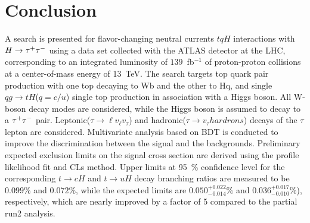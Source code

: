 \section{Conclusion}
\label{sec:conclusion}


A search is presented for flavor-changing neutral currents $tqH$ interactions with $H\to\tau^{+}\tau^{-}$ using a data set collected with the ATLAS
detector at the LHC, corresponding to an integrated luminosity of $139$~fb$^{-1}$ of proton-proton collisions at a center-of-mass energy of 13~TeV.
The search targets top quark pair production with one top decaying to Wb and the other to Hq, and single $qg \to tH$($q=c/u$) single top production in association with a Higgs boson. All W-boson decay modes are considered, while the Higgs boson is assumed to decay to a $\tau^{+}\tau^{-}$ pair. Leptonic($\tau \rightarrow \ell v_{\ell} v_{\tau}$) and hadronic($\tau \rightarrow v_{\tau} hardrons$) decays of the $\tau$ lepton are considered.
Multivariate analysis based on BDT is conducted to improve the discrimination between the signal and the backgrounds. Preliminary expected exclusion limits on the signal cross section are derived using the profile likelihood fit and CLs method. Upper limits at 95~\% confidence level for the corresponding $t\to cH$ and $t\to uH$ decay branching ratios are measured to be $0.099\%$ and $0.072\%$, while the expected limits are $0.050^{+0.022}_{-0.014}\%$ and $0.036^{+0.017}_{-0.010}\%$), respectively, which are nearly improved by a factor of 5 compared to the partial run2 analysis. 